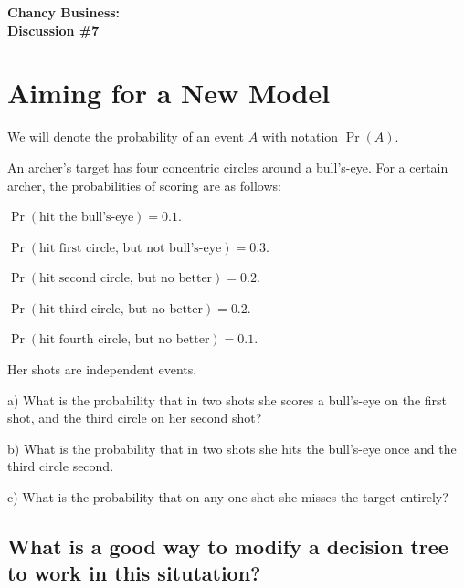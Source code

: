 \documentclass[12pt]{amsart}
\theoremstyle{definition}
\begin{document}
\begin{center}
\textbf{\Huge
Chancy Business:\\ Discussion \#7
}
\end{center}


\vspace{.5in}

\section*{Aiming for a New Model}
We will denote the probability of an event $A$ with notation $\Pr(A)$.

An archer's target has four concentric circles around a bull's-eye. For a certain archer, the probabilities of scoring are as follows:
\begin{compactitem}
\item $\Pr(\text{hit the bull's-eye}) = 0.1$.
\item $\Pr(\text{hit first circle, but not bull's-eye}) = 0.3$.
\item $\Pr(\text{hit second circle, but no better}) = 0.2$.
\item $\Pr(\text{hit third circle, but no better}) = 0.2$.
\item $\Pr(\text{hit fourth circle, but no better}) = 0.1$.
\end{compactitem}
Her shots are independent events.
\vspace{1in}
\begin{compactitem}
\item[a)] What is the probability that in two shots she scores a bull's-eye on the first shot, and the third circle on her second shot?
\vspace{.5in}
\item[b)] What is the probability that in two shots she hits the bull's-eye once and the third circle second.
\vspace{.5in}
\item[c)] What is the probability that on any one shot she misses the target entirely?
\end{compactitem}

\vspace{.5in}

\subsection*{What is a good way to modify a decision tree to work in this situtation?}
\end{document}
